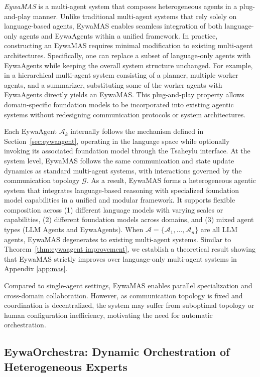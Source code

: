 \textit{EywaMAS} is a multi-agent system that composes heterogeneous agents in a plug-and-play manner. Unlike traditional multi-agent systems that rely solely on language-based agents, EywaMAS enables seamless integration of both language-only agents and EywaAgents within a unified framework. In practice, constructing an EywaMAS requires minimal modification to existing multi-agent architectures. Specifically, one can replace a subset of language-only agents with EywaAgents while keeping the overall system structure unchanged. For example, in a hierarchical multi-agent system consisting of a planner, multiple worker agents, and a summarizer, substituting some of the worker agents with EywaAgents directly yields an EywaMAS. This plug-and-play property allows domain-specific foundation models to be incorporated into existing agentic systems without redesigning communication protocols or system architectures.


Each EywaAgent $\mathcal{A}_k$ internally follows the mechanism defined in Section~\ref{sec:eywaagent}, operating in the language space while optionally invoking its associated foundation model through the Tsaheylu interface.
At the system level, EywaMAS follows the same communication and state update dynamics as standard multi-agent systems, with interactions governed by the communication topology $\mathcal{G}$. 
As a result, EywaMAS forms a heterogeneous agentic system that integrates language-based reasoning with specialized foundation model capabilities in a unified and modular framework. It supports flexible composition across (1) different language models with varying scales or capabilities, (2) different foundation models across domains, and (3) mixed agent types (LLM Agents and EywaAgents).
When $\mathcal{A} =\{\mathcal{A}_1, \dots, \mathcal{A}_n\}$ are all LLM agents, EywaMAS degenerates to existing multi-agent systems. Similar to Theorem~\ref{thm:eywaagent improvement}, we establish a theoretical result showing that EywaMAS strictly improves over language-only multi-agent systems in Appendix \ref{app:mas}.


Compared to single-agent settings, EywaMAS enables parallel specialization and cross-domain collaboration. However, as communication topology is fixed and coordination is decentralized, the system may suffer from suboptimal topology or human configuration inefficiency, motivating the need for automatic orchestration.


\subsection{EywaOrchestra: Dynamic Orchestration of Heterogeneous Experts}


